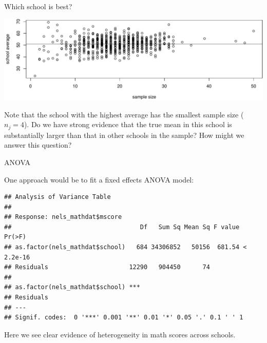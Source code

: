 \documentclass[ignorenonframetext,]{beamer}
\newenvironment{Shaded}{\begin{snugshade}}{\end{snugshade}}
\newcommand{\KeywordTok}[1]{\textcolor[rgb]{0.13,0.29,0.53}{\textbf{#1}}}
\newcommand{\DecValTok}[1]{\textcolor[rgb]{0.00,0.00,0.81}{#1}}
\newcommand{\OperatorTok}[1]{\textcolor[rgb]{0.81,0.36,0.00}{\textbf{#1}}}
\newcommand{\NormalTok}[1]{#1}
\begin{document}
\begin{frame}{Which school is best?}

\includegraphics{anova_06_deck_files/figure-beamer/nelsplot2-1.pdf}

Note that the school with the highest average has the smallest sample
size (\(n_j=4\)). Do we have strong evidence that the true mean in this
school is substantially larger than that in other schools in the sample?
How might we answer this question?

\end{frame}

\begin{frame}[fragile]{ANOVA}

One approach would be to fit a fixed effects ANOVA model:

\begin{Shaded}
\end{Shaded}

\begin{verbatim}
## Analysis of Variance Table
## 
## Response: nels_mathdat$mscore
##                                   Df   Sum Sq Mean Sq F value    Pr(>F)
## as.factor(nels_mathdat$school)   684 34306852   50156  681.54 < 2.2e-16
## Residuals                      12290   904450      74                  
##                                   
## as.factor(nels_mathdat$school) ***
## Residuals                         
## ---
## Signif. codes:  0 '***' 0.001 '**' 0.01 '*' 0.05 '.' 0.1 ' ' 1
\end{verbatim}

Here we see clear evidence of heterogeneity in math scores across
schools.

\end{frame}
\end{document}
